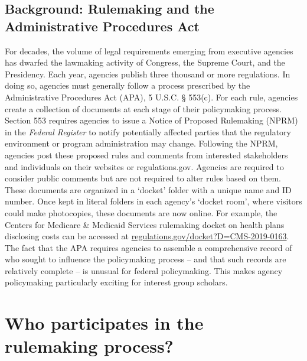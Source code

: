 \documentclass[
      12pt,
        ]{article}
\begin{document}
\hypertarget{background-rulemaking-and-the-administrative-procedures-act}{%
\subsection{Background: Rulemaking and the Administrative Procedures
Act}\label{background-rulemaking-and-the-administrative-procedures-act}}

For decades, the volume of legal requirements emerging from executive
agencies has dwarfed the lawmaking activity of Congress, the Supreme
Court, and the Presidency. Each year, agencies publish three thousand or
more regulations. In doing so, agencies must generally follow a process
prescribed by the Administrative Procedures Act (APA), 5 U.S.C. §
553(c). For each rule, agencies create a collection of documents at each
stage of their policymaking process. Section 553 requires agencies to
issue a Notice of Proposed Rulemaking (NPRM) in the \emph{Federal
Register} to notify potentially affected parties that the regulatory
environment or program administration may change. Following the NPRM,
agencies post these proposed rules and comments from interested
stakeholders and individuals on their websites or regulations.gov.
Agencies are required to consider public comments but are not required
to alter rules based on them. These documents are organized in a
`docket' folder with a unique name and ID number. Once kept in literal
folders in each agency's `docket room', where visitors could make
photocopies, these documents are now online. For example, the Centers
for Medicare \& Medicaid Services rulemaking docket on health plans
disclosing costs can be accessed at
\url{regulations.gov/docket?D=CMS-2019-0163}. The fact that the APA
requires agencies to assemble a comprehensive record of who sought to
influence the policymaking process -- and that such records are
relatively complete -- is unusual for federal policymaking. This makes
agency policymaking particularly exciting for interest group scholars.

\hypertarget{who-participates-in-the-rulemaking-process}{%
\section{Who participates in the rulemaking
process?}\label{who-participates-in-the-rulemaking-process}}
\end{document}
